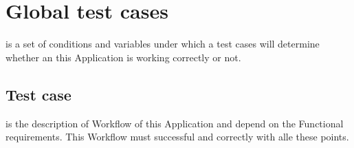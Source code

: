 \section{Global test cases}

is a set of conditions and variables under which a test cases will determine whether an this Application is working correctly 
or not.

\renewcommand{\theenumi}{/T\arabic{enumi}0/}
\renewcommand{\labelenumi}{\theenumi}

\subsection{Test case}

is the description of Workflow of this Application and depend on the Functional requirements. This Workflow must
successful and correctly with alle these points. 

